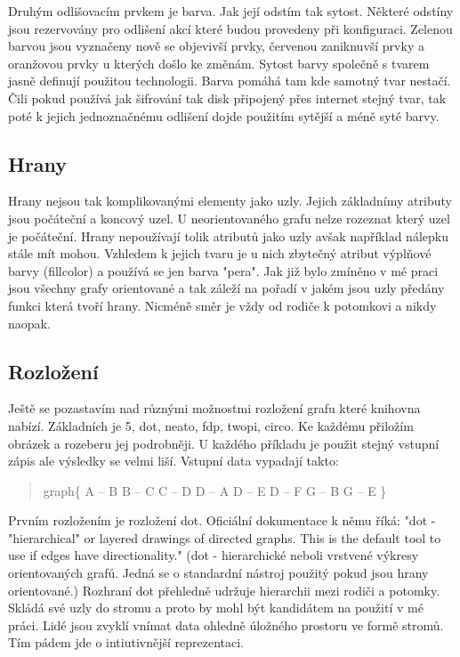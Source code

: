 \documentclass[color,table,oneside,nolot,nolof]{fithesis}
\begin{document}
	Druhým odlišovacím prvkem je barva. Jak její odstím tak sytost. Některé odstíny jsou rezervovány pro odlišení akcí které budou provedeny při konfiguraci. Zelenou barvou jsou vyznačeny
	nově se objevivší prvky, červenou zaniknuvší prvky a oranžovou prvky u kterých došlo ke změnám. Sytost barvy společně s tvarem jasně definují použitou technologii. Barva pomáhá tam kde
	samotný tvar nestačí. Čili pokud používá jak šifrování tak disk připojený přes internet stejný tvar, tak poté k jejich jednoznačnému odlišení dojde použitím sytější a méně syté barvy.

\subsection{Hrany}
	Hrany nejsou tak komplikovanými elementy jako uzly. Jejich základnímy atributy jsou počáteční a koncový uzel. U neorientovaného grafu nelze rozeznat který uzel je počáteční. Hrany 
	nepoužívají tolik atributů jako uzly avšak například nálepku stále mít mohou. Vzhledem k jejich tvaru je u nich zbytečný atribut výplňové barvy (fillcolor) a používá se jen barva 
	"pera".
	Jak již bylo zmíněno v mé praci jsou všechny grafy orientované a tak záleží na pořadí v jakém jsou uzly předány funkci která tvoří hrany. Nicméně směr je vždy od rodiče k potomkovi
	a nikdy naopak.
	
\subsection{Rozložení}
	Ještě se pozastavím nad různými možnostmi rozložení grafu které knihovna nabízí. Základních je 5, dot, neato, fdp, twopi, circo. Ke každému přiložím obrázek a rozeberu jej 
	podrobněji. U každého příkladu je použit stejný vstupní zápis ale výsledky se velmi liší. Vstupní data vypadají takto:
	\begin{quotation}
	graph\{
		A -- B
		B -- C
		C -- D
		D -- A
		D -- E
		D -- F
		G -- B
		G -- E
	\}
	\end{quotation}

	Prvním rozložením je rozložení dot. Oficiální dokumentace k němu říká:
	"dot - "hierarchical" or layered drawings of directed graphs. This is the default tool to use if edges have directionality."\cite{graphviz_layout} (dot - hierarchické neboli
	vrstvené výkresy orientovaných grafů. Jedná se o standardní nástroj použitý pokud jsou hrany orientované.) Rozhraní dot přehledně udržuje hierarchii mezi rodiči a potomky. Skládá
	své uzly do stromu a proto by mohl být kandidátem na použití v mé práci. Lidé jsou zvyklí vnímat data ohledně úložného prostoru ve formě stromů. Tím pádem jde o intiutivnější
	reprezentaci.
\end{document}
